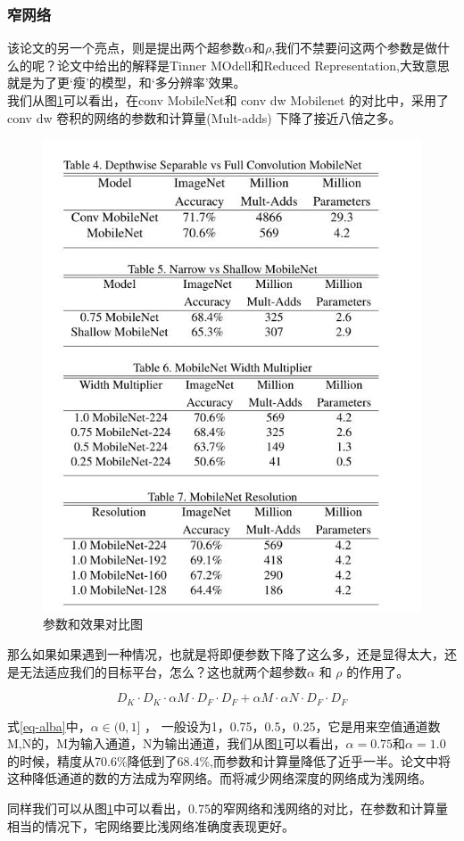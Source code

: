 \documentclass[UTF8,a4paper,12pt]{ctexart}
\begin{document}
\subsubsection{窄网络}
该论文的另一个亮点，则是提出两个超参数$\alpha$和$\rho$,我们不禁要问这两个参数是做什么的呢？论文中给出的解释是Tinner MOdell和Reduced Representation,大致意思就是为了更‘瘦’的模型，和‘多分辨率’效果。\\
我们从图\ref{fig-canshuhexiaoguoduibi}可以看出，在conv MobileNet和 conv dw Mobilenet 的对比中，采用了conv dw 卷积的网络的参数和计算量(Mult-adds) 下降了接近八倍之多。
\begin{figure}[tbph]
	\centering
	\includegraphics[width=0.5\linewidth]{webmin/参数对比图.jpg}
	\caption{参数和效果对比图}
	\label{fig-canshuhexiaoguoduibi}
\end{figure}

那么如果如果遇到一种情况，也就是将即便参数下降了这么多，还是显得太大，还是无法适应我们的目标平台，怎么？这也就两个超参数$\alpha$ 和 $\rho$ 的作用了。

\begin{equation}
	D_{K} \cdot D_{K} \cdot \alpha M \cdot D_{F} \cdot D_{F}+\alpha M \cdot \alpha N \cdot D_{F} \cdot D_{F}
\label{eq-alba}
\end{equation}

式\ref{eq-alba}中，$\alpha \in(0,1]$ ， 一般设为1，0.75，0.5，0.25，它是用来空值通道数M,N的，M为输入通道，N为输出通道，我们从图\ref{fig-canshuhexiaoguoduibi}可以看出，$\alpha=0.75$和$\alpha=1.0$的时候，精度从70.6\%降低到了68.4\%,而参数和计算量降低了近乎一半。论文中将这种降低通道的数的方法成为{\heiti 窄网络}。而将减少网络深度的网络成为{\heiti 浅网络}。

同样我们可以从图\ref{fig-canshuhexiaoguoduibi}中可以看出，0.75的窄网络和浅网络的对比，在参数和计算量相当的情况下，宅网络要比浅网络准确度表现更好。
\end{document}
